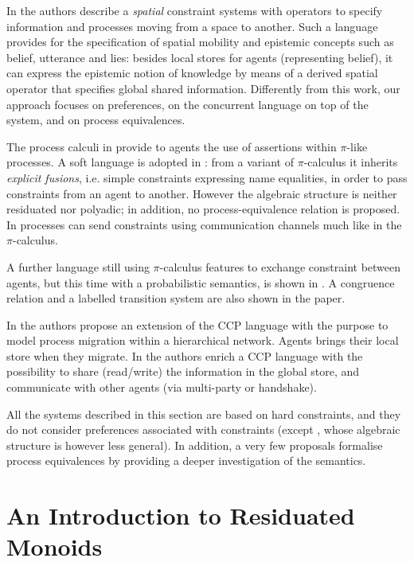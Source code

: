 \documentclass{llncs}
\begin{document}
In \cite{spatialvalencia} the authors describe a \emph{spatial} constraint systems with operators to
specify information and processes moving from a space to another. Such a language provides for the specification of spatial mobility and epistemic concepts such as belief, utterance and lies: besides local stores for agents  (representing belief), it can express the epistemic notion of knowledge by means of a derived spatial operator that specifies global shared information. Differently from this work, our approach focuses on preferences, on the concurrent language on top of the system, and on process equivalences.

The process calculi in \cite{parrowlics,buscemi} provide  to agents the use of assertions within $\pi$-like processes. A soft language is adopted in \cite{buscemi}: from a variant of $\pi$-calculus it inherits \emph{explicit fusions}, i.e. simple constraints expressing name equalities, in order to pass constraints from an agent to another.
 However the algebraic structure is neither residuated nor  polyadic; in addition, no process-equivalence relation is proposed.  In \cite{pi1,pi2}  processes can send constraints using communication channels much like in the $\pi$-calculus. 
 
 A further language still using $\pi$-calculus features to exchange constraint between agents, but this time with a probabilistic semantics, is shown in \cite{bortolussi}. A congruence relation and a labelled transition system are also shown in the paper. 

In \cite{catuscia} the authors propose an extension of the CCP language with the purpose to model process migration within a hierarchical network. Agents brings their local store when they migrate. In \cite{lubos} the authors enrich a CCP language with the possibility to share (read/write) the information in the global store, and communicate with other agents (via multi-party or handshake).

All the systems described in this section are based on hard constraints, and  they do not consider preferences associated with constraints (except \cite{buscemi}, whose algebraic structure is however less general). In addition, a very few proposals formalise process equivalences by providing a deeper investigation of the semantics.

\section{An Introduction to Residuated Monoids}\label{sec:bg}
\end{document}
